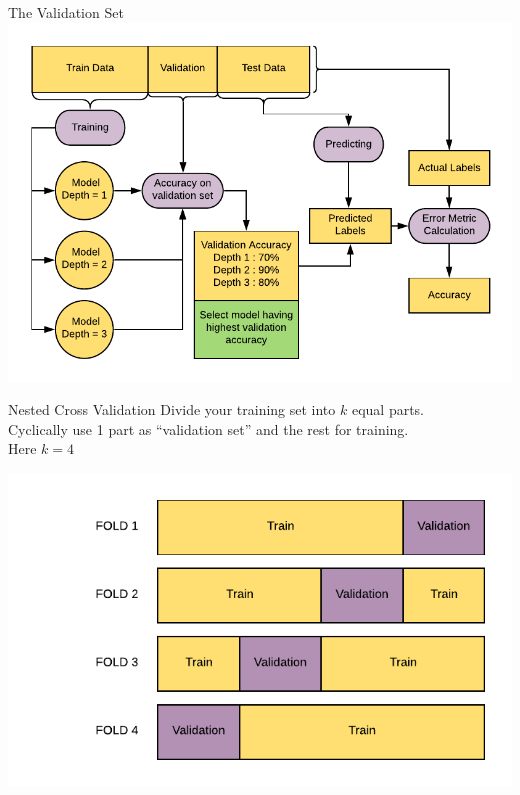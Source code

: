 \documentclass{beamer}
\begin{document}
	\begin{frame}{The Validation Set}
	\includegraphics[width = \textwidth]{../assets/bias-variance/diagrams/validation-workflow}
	\end{frame}

	\begin{frame}{Nested Cross Validation}
	Divide your training set into $k$ equal parts.\\
	 Cyclically use 1 part as ``validation set'' and the rest for training.\\
	Here $k = 4$
	\begin{center}
	\includegraphics[scale=0.7]{../assets/bias-variance/diagrams/cross-validation}
	\end{center}
	\end{frame}
\end{document}
